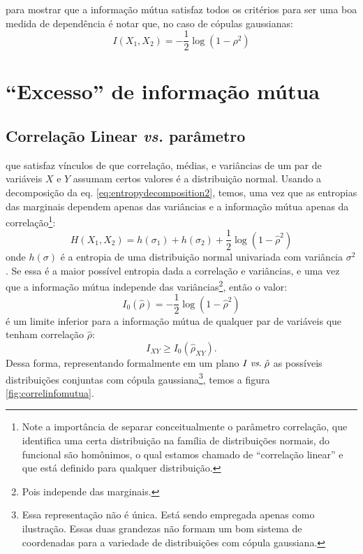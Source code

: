  para mostrar que a informação mútua satisfaz todos os critérios para ser uma boa medida de dependência é notar que, no caso de cópulas gaussianas:
\begin{equation}
\label{eq:infonormal}
I(X_1,X_2) =  - \frac{1}{2}\log\left(1 - \rho^2\right)
\end{equation}
\section{``Excesso'' de informação mútua}
\subsection{Correlação Linear \textit{vs.} parâmetro }
 que satisfaz vínculos de que correlação, médias, e variâncias de um par de variáveis $X$ e $Y$ assumam certos valores é a distribuição normal. Usando a decomposição da eq. \eqref{eq:entropydecomposition2}, temos, uma vez que as entropias das marginais dependem apenas das variâncias e a informação mútua apenas da correlação\footnote{Note a importância de separar conceitualmente o parâmetro correlação, que identifica uma certa distribuição na família de distribuições normais, do funcional são homônimos, o qual estamos chamado de ``correlação linear'' e que está definido para qualquer distribuição.}:
\begin{equation*}
H(X_1,X_2) = h(\sigma_1) + h(\sigma_2) + \frac{1}{2}\log\left(1 - \hat{\rho}^2\right)
\end{equation*}
onde $h(\sigma)$ é a entropia de uma distribuição normal univariada com variância $\sigma^2$. Se essa é a maior possível entropia dada a correlação e variâncias, e uma vez que a informação mútua independe das variâncias\footnote{Pois independe das marginais.}, então o valor:
\begin{equation}
\label{eq:mutinfogaussian}
 I_{0}(\hat{\rho}) = - \frac{1}{2}\log\left(1 - \hat{\rho}^2\right)
\end{equation}
é um limite inferior para a informação mútua de qualquer par de variáveis que tenham correlação $\hat{\rho}$:
\begin{equation}
\label{eq:gaussianinequality}
 I_{XY} \ge I_{0}(\hat{\rho}_{XY}).
\end{equation}
Dessa forma, representando formalmente em um plano $I\;\mbox{\textit{vs}.}\;\hat{\rho}$ as possíveis distribuições conjuntas com cópula gaussiana\footnote{Essa representação não é única. Está sendo empregada apenas como ilustração. Essas duas grandezas não formam um bom sistema de coordenadas para a variedade de distribuições com cópula gaussiana.}, temos a figura \ref{fig:correlinfomutua}.
